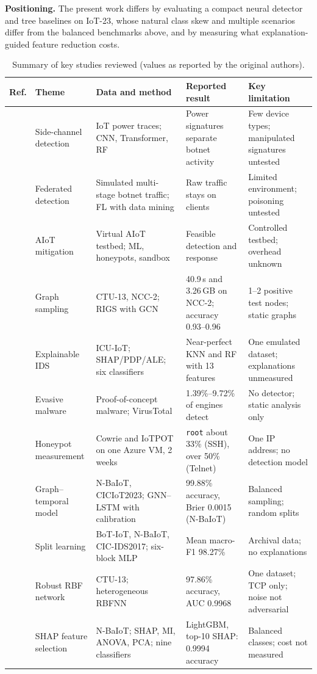 \textbf{Positioning.} The present work differs by evaluating a compact neural detector and tree baselines on IoT-23, whose natural class skew and multiple scenarios differ from the balanced benchmarks above, and by measuring what explanation-guided feature reduction costs.

\begin{table}[!t]
\centering
\caption{Summary of key studies reviewed (values as reported by the original authors).}
\label{tab:related}
\scriptsize
\begin{tabularx}{\textwidth}{@{}l p{2.2cm} Y Y Y@{}}
\toprule
\textbf{Ref.} & \textbf{Theme} & \textbf{Data and method} & \textbf{Reported result} & \textbf{Key limitation} \\
\midrule
\cite{wakili2025} & Side-channel detection & IoT power traces; CNN, Transformer, RF & Power signatures separate botnet activity & Few device types; manipulated signatures untested \\
\cite{sudheera2026} & Federated detection & Simulated multi-stage botnet traffic; FL with data mining & Raw traffic stays on clients & Limited environment; poisoning untested \\
\cite{memos2026} & AIoT mitigation & Virtual AIoT testbed; ML, honeypots, sandbox & Feasible detection and response & Controlled testbed; overhead unknown \\
\cite{chai2026} & Graph sampling & CTU-13, NCC-2; RIGS with GCN & 40.9\,s and 3.26\,GB on NCC-2; accuracy 0.93--0.96 & 1--2 positive test nodes; static graphs \\
\cite{georgiades2025} & Explainable IDS & ICU-IoT; SHAP/PDP/ALE; six classifiers & Near-perfect KNN and RF with 13 features & One emulated dataset; explanations unmeasured \\
\cite{abujazoh2025} & Evasive malware & Proof-of-concept malware; VirusTotal & 1.39\%--9.72\% of engines detect & No detector; static analysis only \\
\cite{banoth2026} & Honeypot measurement & Cowrie and IoTPOT on one Azure VM, 2 weeks & \texttt{root} about 33\% (SSH), over 50\% (Telnet) & One IP address; no detection model \\
\cite{babenko2026} & Graph--temporal model & N-BaIoT, CICIoT2023; GNN--LSTM with calibration & 99.88\% accuracy, Brier 0.0015 (N-BaIoT) & Balanced sampling; random splits \\
\cite{aljaafreh2026} & Split learning & BoT-IoT, N-BaIoT, CIC-IDS2017; six-block MLP & Mean macro-F1 98.27\% & Archival data; no explanations \\
\cite{awad2026} & Robust RBF network & CTU-13; heterogeneous RBFNN & 97.86\% accuracy, AUC 0.9968 & One dataset; TCP only; noise not adversarial \\
\cite{hua2026} & SHAP feature selection & N-BaIoT; SHAP, MI, ANOVA, PCA; nine classifiers & LightGBM, top-10 SHAP: 0.9994 accuracy & Balanced classes; cost not measured \\
\bottomrule
\end{tabularx}
\end{table}